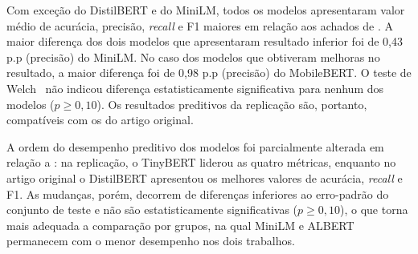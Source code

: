 \documentclass[12pt]{article}
\begin{document}
       Com exceção do DistilBERT e do MiniLM, todos os modelos apresentaram valor médio de acurácia,  precisão, \textit{recall} e F1 maiores em relação aos achados de \cite{bispo2025philder}. A maior diferença dos dois modelos que apresentaram resultado inferior  foi de 0,43 p.p (precisão) do MiniLM. No caso dos modelos que obtiveram melhoras no resultado, a  maior diferença foi de 0,98 p.p (precisão) do MobileBERT. O teste de Welch~\cite{welch1947generalization} não indicou diferença estatisticamente significativa para nenhum dos modelos ($p \geq 0{,}10$). Os resultados preditivos da replicação são, portanto, compatíveis com os do artigo original.
                
        A ordem do desempenho preditivo dos modelos foi parcialmente alterada em relação a \cite{bispo2025philder}: na replicação, o TinyBERT liderou as quatro métricas, enquanto no artigo original o DistilBERT apresentou os melhores valores de acurácia, \textit{recall} e F1. As mudanças, porém, decorrem de diferenças inferiores ao erro-padrão do conjunto de teste e não são estatisticamente significativas ($p \geq 0{,}10$), o que torna mais adequada a comparação por grupos, na qual MiniLM e ALBERT permanecem com o menor desempenho nos dois trabalhos. 

\end{document}
